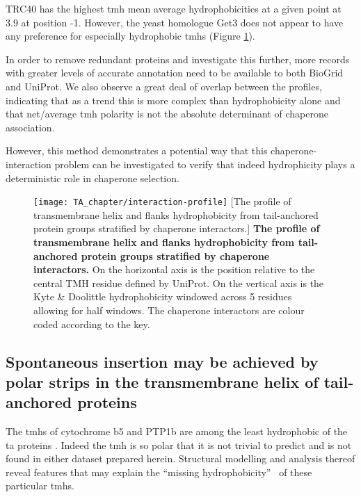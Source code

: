 TRC40 has the highest \gls{tmh} mean average hydrophobicities at a given point at 3.9 at position -1.
However, the yeast homologue Get3 does not appear to have any preference for especially hydrophobic \gls{tmh}s (Figure \ref{fig:interaction-profile}).

In order to remove redundant proteins and investigate this further, more records with greater levels of accurate annotation need to be available to both BioGrid and UniProt.
We also observe a great deal of overlap between the profiles, indicating that as a trend this is more complex than hydrophobicity alone and that net/average \gls{tmh} polarity is not the absolute determinant of chaperone association.

However, this method demonstrates a potential way that this chaperone\--interaction problem can be investigated to verify that indeed hydrophicity plays a deterministic role in chaperone selection.

\begin{figure}
\centering
\texttt{[image: TA\_chapter/interaction-profile]}
[The profile of transmembrane helix and flanks hydrophobicity from tail\--anchored protein groups stratified by chaperone interactors.]
{\textbf{The profile of transmembrane helix and flanks hydrophobicity from tail\--anchored protein groups stratified by chaperone interactors.}
On the horizontal axis is the position relative to the central TMH residue defined by UniProt.
On the vertical axis is the Kyte \& Doolittle hydrophobicity windowed across 5 residues allowing for half windows.
The chaperone interactors are colour coded according to the key.
}

\label{fig:interaction-profile}
\end{figure}

\subsection{Spontaneous insertion may be achieved by polar strips in the transmembrane helix of tail-anchored proteins}

The \gls{tmh}s of cytochrome b5 and PTP1b are among the least hydrophobic of the \gls{ta} proteins \cite{Rabu2008, Rabu2009}.
Indeed the \gls{tmh} is so polar that it is not trivial to predict and is not found in either dataset prepared herein.
Structural modelling and analysis thereof reveal features that may explain the ``missing hydrophobicity''~\cite{Hessa2005, Hedin2010, Hessa2007, Ojemalm2012} of these particular \gls{tmh}s.

